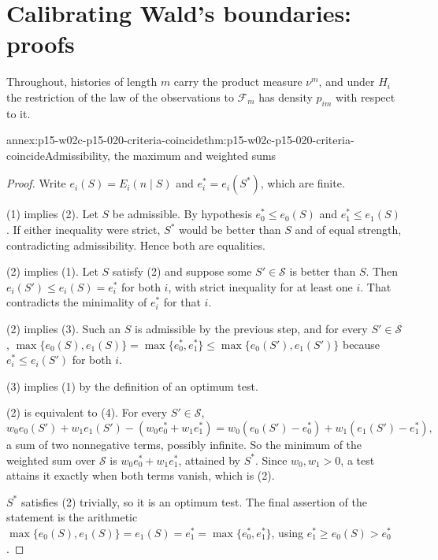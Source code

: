 \section{Calibrating Wald's boundaries: proofs}
\label{sec:annex-p15-w02c-p15-020-calibration}

Throughout, histories of length \(m\) carry the product measure
\(\nu^m\), and under \(H_i\) the restriction of the law of the
observations to \(\mathcal F_m\) has density \(p_{im}\) with respect
to it.

\begin{annexitem}{annex:p15-w02c-p15-020-criteria-coincide}{thm:p15-w02c-p15-020-criteria-coincide}{Admissibility, the maximum and weighted sums}
\begin{proof}
Write \(e_i(S)=E_i(n\mid S)\) and \(e_i^*=e_i(S^*)\), which are finite.

(1) implies (2). Let \(S\) be admissible. By hypothesis
\(e_0^*\leq e_0(S)\) and \(e_1^*\leq e_1(S)\). If either inequality
were strict, \(S^*\) would be better than \(S\) and of equal strength,
contradicting admissibility. Hence both are equalities.

(2) implies (1). Let \(S\) satisfy (2) and suppose some
\(S'\in\mathcal S\) is better than \(S\). Then \(e_i(S')\leq e_i(S)=e_i^*\)
for both \(i\), with strict inequality for at least one \(i\). That
contradicts the minimality of \(e_i^*\) for that \(i\).

(2) implies (3). Such an \(S\) is admissible by the previous step, and
for every \(S'\in\mathcal S\),
\(\max\{e_0(S),e_1(S)\}=\max\{e_0^*,e_1^*\}\leq\max\{e_0(S'),e_1(S')\}\)
because \(e_i^*\leq e_i(S')\) for both \(i\).

(3) implies (1) by the definition of an optimum test.

(2) is equivalent to (4). For every \(S'\in\mathcal S\),
\[
 w_0e_0(S')+w_1e_1(S')-(w_0e_0^*+w_1e_1^*)
 =w_0(e_0(S')-e_0^*)+w_1(e_1(S')-e_1^*),
\]
a sum of two nonnegative terms, possibly infinite. So the minimum of the
weighted sum over \(\mathcal S\) is \(w_0e_0^*+w_1e_1^*\), attained by
\(S^*\). Since \(w_0,w_1>0\), a test attains it exactly when both terms
vanish, which is (2).

\(S^*\) satisfies (2) trivially, so it is an optimum test. The final
assertion of the statement is the arithmetic
\(\max\{e_0(S),e_1(S)\}=e_1(S)=e_1^*=\max\{e_0^*,e_1^*\}\), using
\(e_1^*\geq e_0(S)>e_0^*\).
\end{proof}
\end{annexitem}

